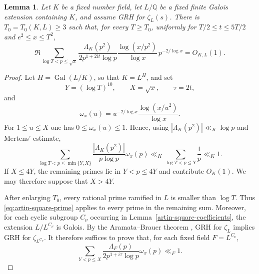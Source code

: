 \documentclass[twoside,reqno,11pt,a4paper]{amsart}
\numberwithin{equation}{section}
\theoremstyle{plain}
\newtheorem{lem}[thm]{Lemma}
\theoremstyle{definition}
\theoremstyle{remark}
\DeclareMathOperator{\Gal}{Gal}
\renewcommand{\le}{\leqslant}
\renewcommand{\ge}{\geqslant}
\begin{document}
\begin{lem}\label{dedekind-square-tail}
Let $K$ be a fixed number field, let $L/\mathbb Q$ be a fixed finite Galois extension containing $K$, and assume GRH for $\zeta_L(s)$.  There is $T_0=T_0(K,L)\ge3$ such that, for every $T\ge T_0$, uniformly for $T/2\le t\le5T/2$ and $e^2\le x\le T^2$,
\begin{equation*}
\Re\sum_{\log T<p\le\sqrt x}
\frac{\Lambda_K(p^2)}{2p^{1+2it}\log p}
\frac{\log(x/p^2)}{\log x}\,p^{-2/\log x}
=O_{K,L}(1).
\end{equation*}
\end{lem}
\begin{proof}
Let $H=\Gal(L/K)$, so that $K=L^H$, and set
\begin{equation*}
        Y=(\log T)^{10},
        \qquad
        X=\sqrt x,
        \qquad
        \tau=2t,
\end{equation*}
and
\begin{equation*}
        \omega_x(u)
        =u^{-2/\log x}\frac{\log(x/u^2)}{\log x}.
\end{equation*}
For $1\le u\le X$ one has $0\le\omega_x(u)\le1$.  Hence, using
$|\Lambda_K(p^2)|\ll_K\log p$ and Mertens' estimate,
\begin{equation*}
        \sum_{\log T<p\le\min\{Y,X\}}
        \frac{|\Lambda_K(p^2)|}{p\log p}\omega_x(p)
        \ll_K
        \sum_{\log T<p\le Y}\frac1p
        \ll_K1.
\end{equation*}
If $X\le4Y$, the remaining primes lie in $Y<p\le4Y$ and contribute
$O_K(1)$.  We may therefore suppose that $X>4Y$.

After enlarging $T_0$, every rational prime ramified in $L$ is smaller than
$\log T$.  Thus \eqref{eq:artin-square-prime} applies to every prime in the
remaining sum.  Moreover, for each cyclic subgroup $C_\nu$ occurring in
Lemma~\ref{artin-square-coefficients}, the extension $L/L^{C_\nu}$ is
Galois.  By the Aramata--Brauer theorem \cite{Aramata,Brauer}, GRH for
$\zeta_L$ implies GRH for $\zeta_{L^{C_\nu}}$.  It therefore suffices to
prove that, for each fixed field $F=L^{C_\nu}$,
\begin{equation}\label{eq:square-tail-auxiliary-field}
        \sum_{Y<p\le X}
        \frac{\Lambda_F(p)}{2p^{1+i\tau}\log p}\omega_x(p)
        \ll_F1.
\end{equation}


\end{proof}
\end{document}
